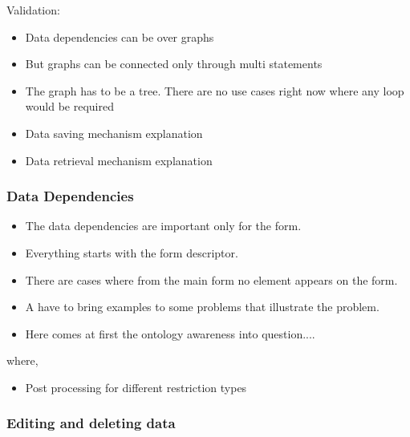 Validation:

\begin{itemize}
	\item Data dependencies can be over graphs
	\item But graphs can be connected only through multi statements
	\item The graph has to be a tree. There are no use cases right now where any loop would be required
\end{itemize}


\begin{itemize}
	\item Data saving mechanism explanation
	\item Data retrieval mechanism explanation
\end{itemize}

\subsubsection{Data Dependencies}


\begin{itemize}
	\item The data dependencies are important only for the form. 
	\item Everything starts with the form descriptor.
	\item There are cases where from the main form no element appears on the form.
	\item A have to bring examples to some problems that illustrate the problem.
	\item Here comes at first the ontology awareness into question....
\end{itemize}



where,



\begin{itemize}
	\item Post processing for different restriction types
\end{itemize}



\subsubsection{Editing and deleting data}

